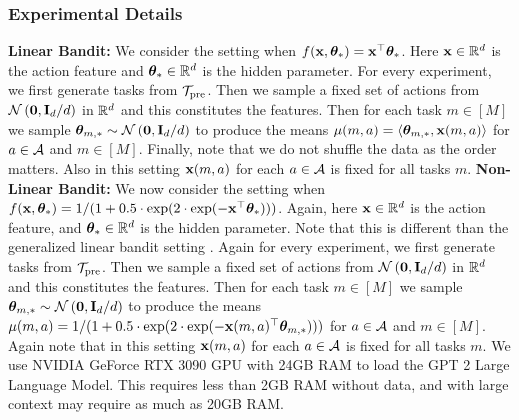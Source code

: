 \documentclass[10pt]{article}
\theoremstyle{plain}
\theoremstyle{definition}
\theoremstyle{remark}
\begin{document}
\subsubsection{Experimental Details}
\textbf{Linear Bandit:} We consider the setting when $f(\mathbf{x}, \boldsymbol{\theta}_*) = \mathbf{x}^\top\boldsymbol{\theta}_*$. Here $\mathbf{x} \in \mathbb{R}^d$ is the action feature and $\boldsymbol{\theta}_*\in\mathbb{R}^d$ is the hidden parameter.
For every experiment, we first generate tasks from $\mathcal{T}_{\text{pre}}$. Then we sample a fixed set of actions from  $\mathcal{N}\left(\mathbf{0}, \mathbf{I}_d / d\right)$ in $\mathbb{R}^d$ and this constitutes the features.
Then for each task $m\in [M]$ we sample $\boldsymbol{\theta}_{m ,*} \sim \mathcal{N}\left(\mathbf{0}, \mathbf{I}_d / d\right)$ to produce the means $\mu(m,a)=\left\langle\boldsymbol{\theta}_{m ,*}, \mathbf{x}(m,a)\right\rangle$ for $a \in \mathcal{A}$ and $m\in [M]$.
Finally, note that we do not shuffle the data as the order matters. Also in this setting $\mathbf{x}(m, a)$ for each $a\in\mathcal{A}$ is fixed for all tasks $m$.
\textbf{Non-Linear Bandit:} We now consider the setting when $f(\mathbf{x}, \boldsymbol{\theta}_*) = 1/(1 + 0.5\cdot\exp(2\cdot\exp(- \mathbf{x}^\top \boldsymbol{\theta}_*)))$. Again, here $\mathbf{x} \in \mathbb{R}^d$ is the action feature, and $\boldsymbol{\theta}_*\in\mathbb{R}^d$ is the hidden parameter.
Note that this is different than the generalized linear bandit setting \citep{filippi2010parametric, li2017provably}.
Again for every experiment, we first generate tasks from $\mathcal{T}_{\text{pre}}$. Then we sample a fixed set of actions from  $\mathcal{N}\left(\mathbf{0}, \mathbf{I}_d / d\right)$ in $\mathbb{R}^d$ and this constitutes the features.
Then for each task $m\in [M]$ we sample $\boldsymbol{\theta}_{m ,*} \sim \mathcal{N}\left(\mathbf{0}, \mathbf{I}_d / d\right)$ to produce the means $\mu(m,a)=1/(1 + 0.5\cdot\exp(2\cdot\exp(- \mathbf{x}(m,a)^\top \boldsymbol{\theta}_{m,*})))$ for $a \in \mathcal{A}$ and $m\in [M]$.
Again note that in this setting $\mathbf{x}(m, a)$ for each $a\in\mathcal{A}$ is fixed for all tasks $m$.
We use NVIDIA GeForce RTX 3090 GPU with 24GB RAM to load the GPT 2 Large Language Model. This requires less than 2GB RAM without data, and with large context may require as much as 20GB RAM.
\end{document}
